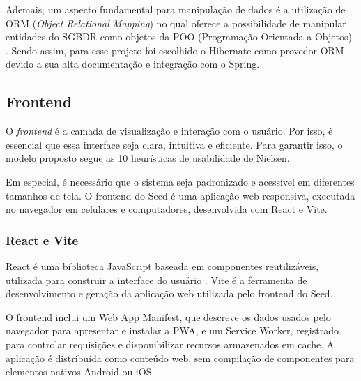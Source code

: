 Ademais, um aspecto fundamental para manipulação de dados é a utilização de ORM (\textit{Object Relational Mapping}) no qual oferece a possibilidade de manipular entidades do SGBDR como objetos da POO (Programação Orientada a Objetos) \cite{weissmann2014vire}. Sendo assim, para esse projeto foi escolhido o Hibernate como provedor ORM devido a sua alta documentação e integração com o Spring.

\subsection{Frontend}

O \textit{frontend} é a camada de visualização e interação com o usuário. Por isso, é essencial que essa interface seja clara, intuitiva e eficiente. Para garantir isso, o modelo proposto segue as 10 heurísticas de usabilidade de Nielsen.

Em especial, é necessário que o sistema seja padronizado e acessível em diferentes tamanhos de tela. O frontend do Seed é uma aplicação web responsiva, executada no navegador em celulares e computadores, desenvolvida com React e Vite.

\subsubsection{React e Vite}

React é uma biblioteca JavaScript baseada em componentes reutilizáveis, utilizada para construir a interface do usuário \cite{boduch2017react}. Vite é a ferramenta de desenvolvimento e geração da aplicação web utilizada pelo frontend do Seed.

O frontend inclui um Web App Manifest, que descreve os dados usados pelo navegador para apresentar e instalar a PWA, e um Service Worker, registrado para controlar requisições e disponibilizar recursos armazenados em cache. A aplicação é distribuída como conteúdo web, sem compilação de componentes para elementos nativos Android ou iOS.